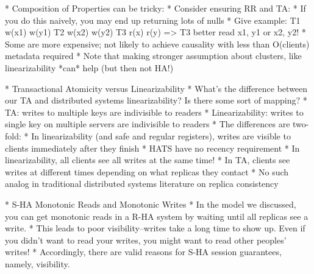 * Composition of Properties can be tricky:
	* Consider ensuring RR and TA:
		* If you do this naively, you may end up returning lots of nulls
		* Give example: T1 w(x1) w(y1) T2 w(x2) w(y2) T3 r(x) r(y) => T3 better read x1, y1 or x2, y2!
	* Some are more expensive; not likely to achieve causality with less than O(clients) metadata required
		* Note that making stronger assumption about clusters, like linearizability *can* help (but then not HA!)

* Transactional Atomicity versus Linearizability
	* What's the difference between our TA and distributed systems linearizability? Is there some sort of mapping?
		* TA: writes to multiple keys are indivisible to readers
		* Linearizability: writes to single key on multiple servers are indivisible to readers
	* The differences are two-fold:
		* In linearizability (and safe and regular registers), writes are visible to clients immediately after they finish
			* HATS have no recency requirement
		* In linearizability, all clients see all writes at the same time!
			* In TA, clients see writes at different times depending on what replicas they contact
			* No such analog in traditional distributed systems literature on replica consistency
	
* S-HA Monotonic Reads and Monotonic Writes
	* In the model we discussed, you can get monotonic reads in a R-HA system by waiting until all replicas see a write.
	* This leads to poor visibility--writes take a long time to show up. Even if you didn't want to read your writes, you might want to read other peoples' writes!
	* Accordingly, there are valid reasons for S-HA session guarantees, namely, visibility.
